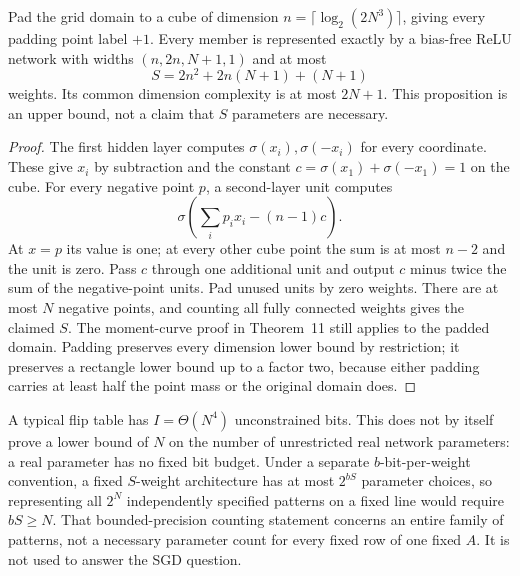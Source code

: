 \begin{proposition}\label{thm:network}
Pad the grid domain to a cube of dimension $n=\lceil\log_2(2N^3)\rceil$, giving every padding point label $+1$. Every member is represented exactly by a bias-free ReLU network with widths $(n,2n,N+1,1)$ and at most
\[
 S=2n^2+2n(N+1)+(N+1)
\]
weights. Its common dimension complexity is at most $2N+1$. This proposition is an upper bound, not a claim that $S$ parameters are necessary.
\end{proposition}
\begin{proof}
The first hidden layer computes $\sigma(x_i),\sigma(-x_i)$ for every coordinate. These give $x_i$ by subtraction and the constant $c=\sigma(x_1)+\sigma(-x_1)=1$ on the cube. For every negative point $p$, a second-layer unit computes
\[
 \sigma\left(\sum_i p_ix_i-(n-1)c\right).
\]
At $x=p$ its value is one; at every other cube point the sum is at most $n-2$ and the unit is zero. Pass $c$ through one additional unit and output $c$ minus twice the sum of the negative-point units. Pad unused units by zero weights. There are at most $N$ negative points, and counting all fully connected weights gives the claimed $S$. The moment-curve proof in Theorem~11 still applies to the padded domain. Padding preserves every dimension lower bound by restriction; it preserves a rectangle lower bound up to a factor two, because either padding carries at least half the point mass or the original domain does.
\end{proof}

A typical flip table has $I=\Theta(N^4)$ unconstrained bits. This does not by itself prove a lower bound of $N$ on the number of unrestricted real network parameters: a real parameter has no fixed bit budget. Under a separate $b$-bit-per-weight convention, a fixed $S$-weight architecture has at most $2^{bS}$ parameter choices, so representing all $2^N$ independently specified patterns on a fixed line would require $bS\ge N$. That bounded-precision counting statement concerns an entire family of patterns, not a necessary parameter count for every fixed row of one fixed $A$. It is not used to answer the SGD question.


